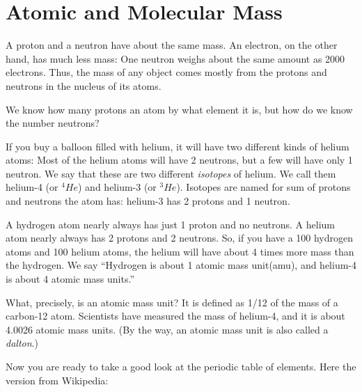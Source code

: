 \chapter{Atomic and Molecular Mass}

A proton and a neutron have about the same mass. An electron, on the
other hand, has much less mass: One neutron weighs about the same
amount as 2000 electrons. Thus, the mass of any object comes mostly
from the protons and neutrons in the nucleus of its atoms. 

We know how many protons an atom by what element it is, but how do we know the number neutrons?

If you buy a balloon filled with helium, it will have two different
kinds of helium atoms: Most of the helium atoms will have 2 neutrons, but a
few will have only 1 neutron. We say that these are two different
\textit{isotopes} of helium. We call them helium-4 (or $^4He$) and
helium-3 (or $^3He$).  Isotopes are named for sum of protons and
neutrons the atom has: helium-3 has 2 protons and 1 neutron.

A hydrogen atom nearly always has just 1 proton and no neutrons. A
helium atom nearly always has 2 protons and 2 neutrons. So, if you
have a 100 hydrogen atoms and 100 helium atoms, the helium will have
about 4 times more mass than the hydrogen. We say ``Hydrogen is about
1 atomic mass unit(amu), and helium-4 is about 4 atomic mass
units.''

What, precisely, is an atomic mass unit? It is defined as 1/12 of
the mass of a carbon-12 atom. Scientists have measured the mass of
helium-4, and it is about 4.0026 atomic mass units. (By the way, an
atomic mass unit is also called a \textit{dalton}.)

\pagebreak

Now you are ready to take a good look at the periodic table of
elements. Here the version from Wikipedia:

